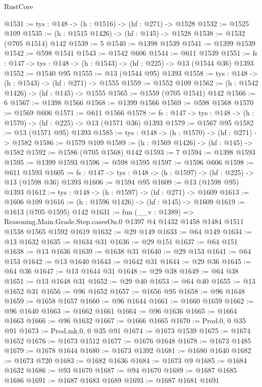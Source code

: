 \begin{lexlean}{RustCore}
\begin{coremodule}
@1531 := {tys : @148} -> (h : @1516) -> (hf : @271) -> @1528
@1532 := @1525 @109
@1535 := (h : @1515 @1426) -> (hf : @145) -> @1528
@1538 := @1532 (@705 @1514) @142
@1539 := 5
@1540 := @1398 @1539
@1541 := @1399 @1539
@1542 := @598 @1541
@1543 := @1542 @606
@1544 := @611 @1539
@1551 := {fs : @147} -> {tys : @148} -> (h : @1543) -> (hf : @225) -> @13 (@1544 @36) @1393
@1552 := @1540 @95
@1555 := @13 (@1544 @95) @1393
@1558 := {tys : @148} -> (h : @1543) -> (hf : @271) -> @1555
@1559 := @1552 @109
@1562 := (h : @1542 @1426) -> (hf : @145) -> @1555
@1565 := @1559 (@705 @1541) @142
@1566 := 6
@1567 := @1398 @1566
@1568 := @1399 @1566
@1569 := @598 @1568
@1570 := @1569 @606
@1571 := @611 @1566
@1578 := {fs : @147} -> {tys : @148} -> (h : @1570) -> (hf : @225) -> @13 (@1571 @36) @1393
@1579 := @1567 @95
@1582 := @13 (@1571 @95) @1393
@1585 := {tys : @148} -> (h : @1570) -> (hf : @271) -> @1582
@1586 := @1579 @109
@1589 := (h : @1569 @1426) -> (hf : @145) -> @1582
@1592 := @1586 (@705 @1568) @142
@1593 := 7
@1594 := @1398 @1593
@1595 := @1399 @1593
@1596 := @598 @1595
@1597 := @1596 @606
@1598 := @611 @1593
@1605 := {fs : @147} -> {tys : @148} -> (h : @1597) -> (hf : @225) -> @13 (@1598 @36) @1393
@1606 := @1594 @95
@1609 := @13 (@1598 @95) @1393
@1612 := {tys : @148} -> (h : @1597) -> (hf : @271) -> @1609
@1613 := @1606 @109
@1616 := (h : @1596 @1426) -> (hf : @145) -> @1609
@1619 := @1613 (@705 @1595) @142
@1631 := fun (__v : @1389) =>
  Reasoning.Main.Grade.Step.casesOn.{0} @1397 @4 @1432 @1458 @1484 @1511 @1538 @1565 @1592 @1619
@1632 := @29 @149
@1633 := @64 @149
@1634 := @13 @1632
@1635 := @1634 @31
@1636 := @29 @151
@1637 := @64 @151
@1638 := @13 @1636
@1639 := @1638 @31
@1640 := @29 @153
@1641 := @64 @153
@1642 := @13 @1640
@1643 := @1642 @31
@1644 := @29 @36
@1645 := @64 @36
@1647 := @13 @1644 @31
@1648 := @29 @38
@1649 := @64 @38
@1651 := @13 @1648 @31
@1652 := @29 @40
@1653 := @64 @40
@1655 := @13 @1652 @31
@1656 := @96 @1652
@1657 := @1656 @95
@1658 := @96 @1648
@1659 := @1658 @1657
@1660 := @96 @1644
@1661 := @1660 @1659
@1662 := @96 @1640
@1663 := @1662 @1661
@1664 := @96 @1636
@1665 := @1664 @1663
@1666 := @96 @1632
@1667 := @1666 @1665
@1670 := Prod.{0, 0} @35 @91
@1673 := Prod.mk.{0, 0} @35 @91
@1674 := @1673 @1539
@1675 := @1674 @1652
@1676 := @1673 @1512
@1677 := @1676 @1648
@1678 := @1673 @1485
@1679 := @1678 @1644
@1680 := @1673 @1392
@1681 := @1680 @1640
@1682 := @1673 @720
@1683 := @1682 @1636
@1684 := @1673 @9
@1685 := @1684 @1632
@1686 := @93 @1670
@1687 := @94 @1670
@1689 := @1687 @1685 @1686
@1691 := @1687 @1683 @1689
@1693 := @1687 @1681 @1691

\end{coremodule}
\end{lexlean}
